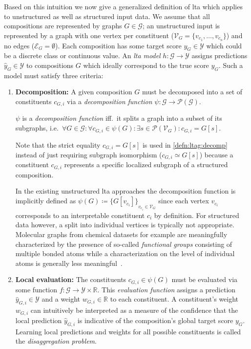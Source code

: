 Based on this intuition we now give a generalized definition of \ac{lta} which applies to unstructured as well as structured input data.
We assume that all compositions are represented by graphs $G \in \mathcal{G}$;
an unstructured input is represented by a graph with one vertex per constituent ($\mathcal{V}_G = \{ v_{c_1}, \dots, v_{c_n} \}$) and no edges ($\mathcal{E}_G = \emptyset$).
Each composition has some target score $y_G \in \mathcal{Y}$ which could be a discrete class or continuous value.
An \textit{\ac{lta} model} $h: \mathcal{G} \to \mathcal{Y}$ assigns predictions $\hat{y}_G \in \mathcal{Y}$ to compositions $G$ which ideally correspond to the true score $y_G$.
Such a model must satisfy three criteria:
\begin{enumerate}[label=\textbf{\arabic*.}]
	\item \textbf{Decomposition:}
		A given composition $G$ must be decomposed into a set of constituents $c_{G,i}$ via a \textit{decomposition function} $\psi: \mathcal{G} \to \mathcal{P}(\mathcal{G})$.
		\begin{defn}\label{defn:ltag:decomp}
			$\psi$ is a \textit{decomposition function} iff.\ it splits a graph into a subset of its subgraphs, i.e.\ $\forall G \in \mathcal{G}: \forall c_{G,i} \in \psi(G): \exists s \in \mathcal{P}(\mathcal{V}_G): c_{G,i} = G[s]$.
		\end{defn}
		Note that the strict equality $c_{G,i} = G[s]$ is used in \cref{defn:ltag:decomp} instead of just requiring subgraph isomorphism ($c_{G,i} \simeq G[s]$) because a constituent $c_{G,i}$ represents a specific localized subgraph of a structured composition.

		In the existing unstructured \ac{lta} approaches the decomposition function is implicitly defined as $\psi(G) \coloneqq {\{ G[v_{c_i}] \}}_{v_{c_i} \in \mathcal{V}_G}$ since each vertex $v_{c_i}$ corresponds to an interpretable constituent $c_i$ by definition.
		For structured data however, a split into individual vertices is typically not appropriate.
		Molecular graphs from chemical datasets for example are meaningfully characterized by the presence of so-called \textit{functional groups} consisting of multiple bonded atoms while a characterization on the level of individual atoms is generally less meaningful~\cite{McNaught1997}.
	\item \textbf{Local evaluation:}
		The constituents $c_{G, i} \in \psi(G)$ must be evaluated via some function $f: \mathcal{G} \to \mathcal{Y} \times \mathbb{R}$.
		This \textit{evaluation function} assigns a prediction $\hat{y}_{G, i} \in \mathcal{Y}$ and a weight $w_{G, i} \in \mathbb{R}$ to each constituent.
		A constituent's weight $w_{G, i}$ can intuitively be interpreted as a measure of the confidence that the local prediction $\hat{y}_{G, i}$ is indicative of the composition's global target score $y_G$.
		Learning local predictions and weights for all possible constituents is called the \textit{disaggregation problem}.


\end{enumerate}
